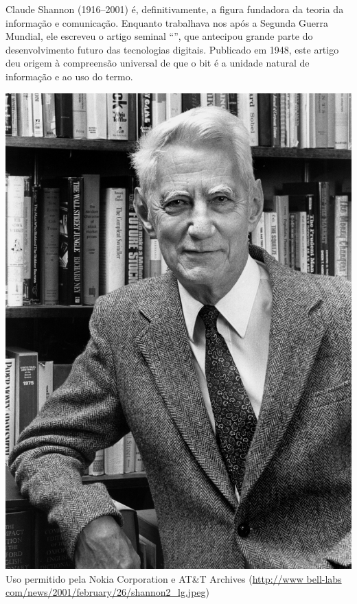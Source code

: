 \begin{tcolorbox}[title={Claude Shannon}]
\begin{minipage}[t]{0.5\linewidth}
\vspace*{0pt}
Claude Shannon (1916--2001) é, definitivamente, a figura fundadora da teoria da
informação e comunicação. Enquanto trabalhava nos  após a Segunda Guerra Mundial, ele escreveu o artigo seminal
``'', que antecipou grande parte
do desenvolvimento futuro das tecnologias digitais. Publicado em 1948, este
artigo deu origem à compreensão universal de que o bit é a unidade natural de
informação e ao uso do termo.
\end{minipage}\hfill%
\begin{minipage}[t]{0.46\linewidth}
\vspace*{0pt}
\label{fig:shannon}
\vspace{-0.3cm}
\includegraphics[width=\linewidth]{imagens/shannon.jpeg}
\\%
\scriptsize{Uso permitido pela Nokia Corporation e AT\&T Archives
(\url{http://www bell-labs com/news/2001/february/26/shannon2_lg.jpeg})}
\end{minipage}
\end{tcolorbox}

